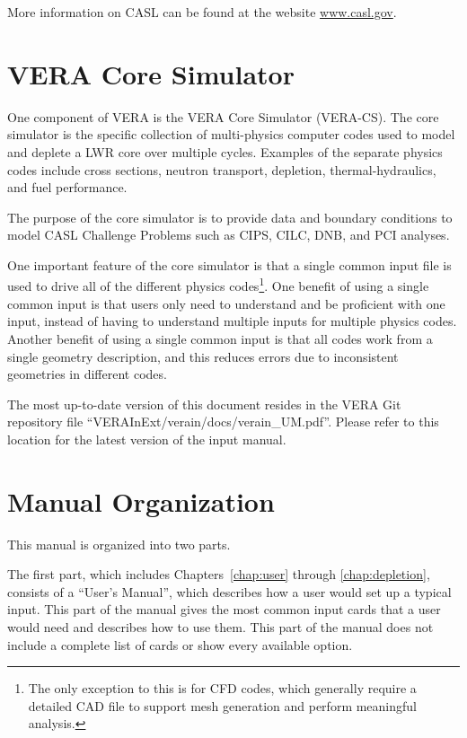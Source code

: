 \documentclass{report}
\numberwithin{equation}{section}
\begin{document}
More information on CASL can be found at the website \href{http://www.casl.gov}{www.casl.gov}.

\section{VERA Core Simulator}
One component of VERA is the VERA Core Simulator (VERA-CS).  The core simulator is the specific collection
of multi-physics computer codes used to model and deplete a LWR core over multiple cycles.
Examples of the separate physics codes include cross sections, neutron transport, depletion,
thermal-hydraulics, and fuel performance.

The purpose of the core simulator is to provide data and boundary conditions to model
CASL Challenge Problems such as CIPS, CILC, DNB, and PCI analyses.

One important feature of the core simulator is that a single common input file is used to drive all
of the different physics codes\footnote{The only exception to this is for CFD codes,
which generally require a detailed CAD file to support mesh generation and perform meaningful analysis.}.
One benefit of using a single common input is that users only need to understand and be proficient with one input,
instead of having to understand multiple inputs for multiple physics codes.
Another benefit of using a single common input is that all codes work from a single
geometry description, and this reduces errors due to inconsistent geometries in different codes.

The most up-to-date version of this document resides in the VERA Git repository file
``VERAInExt/verain/docs/verain\_UM.pdf''.  
Please refer to this location for the latest version of the input manual.


\section{Manual Organization}

This manual is organized into two parts.  

The first part, which includes Chapters~\ref{chap:user} through \ref{chap:depletion}, consists of a ``User's Manual'',
which describes how a user would set up a typical input.  This part of the manual gives
the most common input cards that a user would need and describes how to use them.
This part of the manual does not include a complete list of cards or show every available option.
\end{document}
